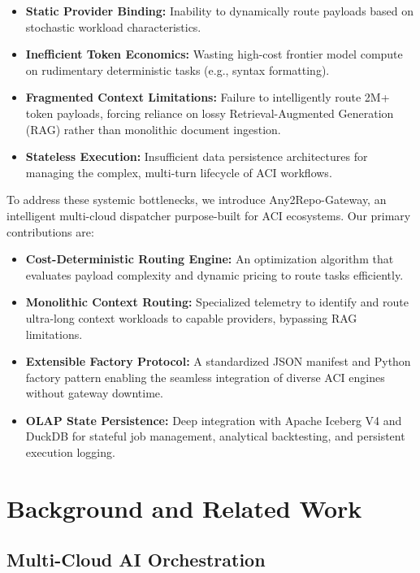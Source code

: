 \documentclass[10pt]{article}
\begin{document}
\begin{itemize}
    \item \textbf{Static Provider Binding:} Inability to dynamically route payloads based on stochastic workload characteristics.
    \item \textbf{Inefficient Token Economics:} Wasting high-cost frontier model compute on rudimentary deterministic tasks (e.g., syntax formatting).
    \item \textbf{Fragmented Context Limitations:} Failure to intelligently route 2M+ token payloads, forcing reliance on lossy Retrieval-Augmented Generation (RAG) rather than monolithic document ingestion.
    \item \textbf{Stateless Execution:} Insufficient data persistence architectures for managing the complex, multi-turn lifecycle of ACI workflows.
\end{itemize}

To address these systemic bottlenecks, we introduce Any2Repo-Gateway, an intelligent multi-cloud dispatcher purpose-built for ACI ecosystems. Our primary contributions are:

\begin{itemize}
    \item \textbf{Cost-Deterministic Routing Engine:} An optimization algorithm that evaluates payload complexity and dynamic pricing to route tasks efficiently.
    \item \textbf{Monolithic Context Routing:} Specialized telemetry to identify and route ultra-long context workloads to capable providers, bypassing RAG limitations.
    \item \textbf{Extensible Factory Protocol:} A standardized JSON manifest and Python factory pattern enabling the seamless integration of diverse ACI engines without gateway downtime.
    \item \textbf{OLAP State Persistence:} Deep integration with Apache Iceberg V4 and DuckDB for stateful job management, analytical backtesting, and persistent execution logging.
\end{itemize}

\section{Background and Related Work}

\subsection{Multi-Cloud AI Orchestration}
\end{document}
